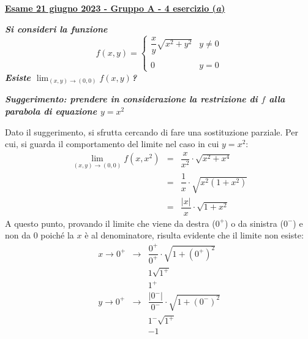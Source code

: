 \documentclass[a4paper]{article}
\newcommand{\definition}[1]{\textcolor{Red3}{\textbf{#1}}}
\newcommand{\example}[1]{\textcolor{Green4}{\textbf{#1}}}
\begin{document}
	\begin{flushleft}
		\label{exam: esame 21 giugno 2023 - Gruppo A - 4 esercizio (a)}
		\hypertarget{
			exam: esame 21 giugno 2023 - Gruppo A - 4 esercizio (a)
		}{
			\definition{\underline{Esame 21 giugno 2023 - Gruppo A - 4 esercizio (\emph{a})}}
		}
	\end{flushleft}
	\example{\emph{Si consideri la funzione}
	\begin{equation*}
		f\left(x,y\right) = \begin{cases}
			\dfrac{x}{y} \sqrt{x^{2} + y^{2}} & y \ne 0 \\
			\\
			0 & y = 0
		\end{cases}
	\end{equation*}
	\emph{Esiste $\displaystyle\lim_{\left(x,y\right) \rightarrow \left(0,0\right)}f\left(x,y\right)$?}}\newline

	\noindent
	\example{\emph{Suggerimento: prendere in considerazione la restrizione di $f$ alla parabola di equazione $y = x^{2}$}}

	\noindent
	Dato il suggerimento, si sfrutta cercando di fare una sostituzione parziale. Per cui, si guarda il comportamento del limite nel caso in cui $y = x^{2}$:
	\begin{equation*}
		\begin{array}{rcl}
			\displaystyle\lim_{\left(x,y\right) \rightarrow \left(0,0\right)} f\left(x,x^{2}\right) &=& \dfrac{x}{x^{2}} \cdot \sqrt{x^{2} + x^{4}} \\ [1em]
			&=& \dfrac{1}{x} \cdot \sqrt{x^{2}\left(1+x^{2}\right)} \\ [1em]
			&=& \dfrac{\left| x \right|}{x} \cdot \sqrt{1+x^{2}}
		\end{array}
	\end{equation*}
	A questo punto, provando il limite che viene da destra ($0^{+}$) o da sinistra ($0^{-}$) e non da $0$ poiché la $x$ è al denominatore, risulta evidente che il limite non esiste:
	\begin{equation*}
		\begin{array}{rcl}
			x \rightarrow 0^{+} &\longrightarrow& \dfrac{0^{+}}{0^{+}} \cdot \sqrt{1+\left(0^{+}\right)^{2}} \\ [1em]
			&& 1 \sqrt{1^{+}} \\ [.5em]
			&& 1^{+} \\ [2em]
			y \rightarrow 0^{+} &\longrightarrow& \dfrac{\left|0^{-}\right|}{0^{-}} \cdot \sqrt{1+\left(0^{-}\right)^{2}} \\ [1em]
			&& 1^{-} \sqrt{1^{+}} \\ [.5em]
			&& -1
		\end{array}
	\end{equation*}\newpage
\end{document}
